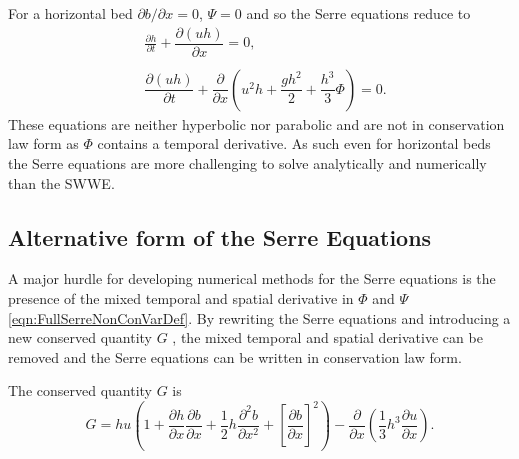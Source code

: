 For a horizontal bed $\partial b / \partial x = 0$, $\Psi = 0$ and so the Serre equations reduce to
\begin{subequations}
	\label{eqn:FullSerreNonConHorizbed}
	\begin{align}
	\label{eqn:FullSerreNonConMassHorizbed}
	&\frac{\partial h}{\partial t} + \dfrac{\partial (uh)}{\partial x} = 0, \\ \nonumber \\
	\label{eqn:FullSerreNonConMomeHorizbed}
	&\dfrac{\partial (uh)}{\partial t} + \dfrac{\partial}{\partial x} \left ( u^2h + \dfrac{gh^2}{2} + \dfrac{h^3}{3}{ \Phi }  \right ) = 0.
	\end{align}
\end{subequations}	
These equations are neither hyperbolic nor parabolic and are not in conservation law form as $\Phi$ contains a temporal derivative. As such even for horizontal beds the Serre equations are more challenging to solve analytically and numerically than the SWWE. 

\subsection{Alternative form of the Serre Equations}
A major hurdle for developing numerical methods for the Serre equations is the presence of the mixed temporal and spatial derivative in $\Phi$ and $\Psi$ \eqref{eqn:FullSerreNonConVarDef}. By rewriting the Serre  equations and introducing a new conserved quantity $G$ \cite{Hank-etal-2010-2034,Zoppou-2014,Li-2014-169}, the mixed temporal and spatial derivative can be removed and the Serre equations can be written in conservation law form.
\begin{defn}
	\label{defn:SerreEqnConservedQuantity1}
	The conserved quantity $G$ is
	\[ G =  h {u} \left(1 + \frac{\partial h}{\partial x}\frac{\partial b}{\partial x} + \frac{1}{2}h\frac{\partial^2 b}{\partial x^2} + \left[\frac{\partial b}{\partial x}\right]^2 \right) - \frac{\partial}{\partial x}\left(\frac{1}{3}h^3  \frac{\partial {u}}{\partial x}\right).\]
\end{defn}

